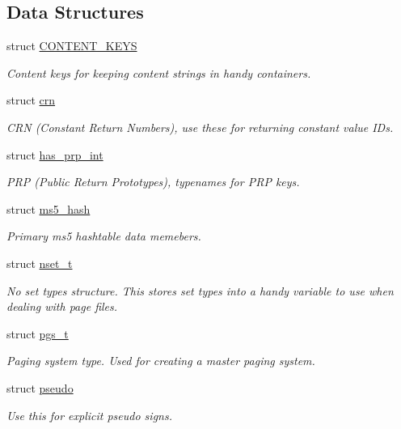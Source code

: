 \subsection*{Data Structures}
\begin{DoxyCompactItemize}
\item 
struct \hyperlink{structcrunchy_1_1_c_o_n_t_e_n_t___k_e_y_s}{C\+O\+N\+T\+E\+N\+T\+\_\+\+K\+E\+Y\+S}
\begin{DoxyCompactList}\small\item\em Content keys for keeping content strings in handy containers. \end{DoxyCompactList}\item 
struct \hyperlink{structcrunchy_1_1crn}{crn}
\begin{DoxyCompactList}\small\item\em C\+R\+N (Constant Return Numbers), use these for returning constant value I\+D\textquotesingle{}s. \end{DoxyCompactList}\item 
struct \hyperlink{structcrunchy_1_1has__prp__int}{has\+\_\+prp\+\_\+int}
\begin{DoxyCompactList}\small\item\em P\+R\+P (Public Return Prototypes), typenames for P\+R\+P keys. \end{DoxyCompactList}\item 
struct \hyperlink{structcrunchy_1_1ms5__hash}{ms5\+\_\+hash}
\begin{DoxyCompactList}\small\item\em Primary ms5 hashtable data memebers. \end{DoxyCompactList}\item 
struct \hyperlink{structcrunchy_1_1nset__t}{nset\+\_\+t}
\begin{DoxyCompactList}\small\item\em No set types structure. This stores set types into a handy variable to use when dealing with page files. \end{DoxyCompactList}\item 
struct \hyperlink{structcrunchy_1_1pgs__t}{pgs\+\_\+t}
\begin{DoxyCompactList}\small\item\em Paging system type. Used for creating a master paging system. \end{DoxyCompactList}\item 
struct \hyperlink{structcrunchy_1_1pseudo}{pseudo}
\begin{DoxyCompactList}\small\item\em Use this for explicit pseudo signs. \end{DoxyCompactList}\item 

\end{DoxyCompactItemize}
